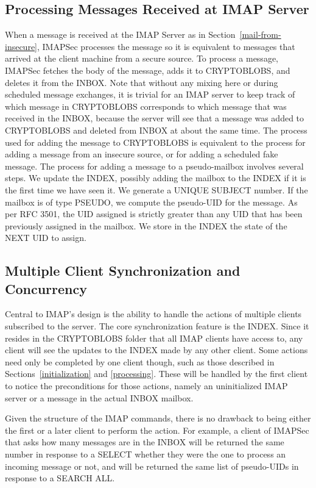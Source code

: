 \documentclass[pageno]{jpaper}
\newcommand{\project}{IMAPSec }
\begin{document}
\subsection{Processing Messages Received at IMAP Server}
When a message is received at the IMAP Server as in Section~\ref{mail-from-insecure}, \project processes the message so it is equivalent to messages that arrived at the client machine from a secure source. To process a message, \project fetches the body of the message, adds it to CRYPTOBLOBS, and deletes it from the INBOX. Note that without any mixing here or during scheduled message exchanges, it is trivial for an IMAP server to keep track of which message in CRYPTOBLOBS corresponds to which message that was received in the INBOX, because the server will see that a message was added to CRYPTOBLOBS and deleted from INBOX at about the same time. The process used for adding the message to CRYPTOBLOBS is equivalent to the process for adding a message from an insecure source, or for adding a scheduled fake message. The process for adding a message to a pseudo-mailbox involves several steps. We update the INDEX, possibly adding the mailbox to the INDEX if it is the first time we have seen it. We generate a UNIQUE SUBJECT number. If the mailbox is of type PSEUDO, we compute the pseudo-UID for the message. As per RFC 3501, the UID assigned is strictly greater than any UID that has been previously assigned in the mailbox. We store in the INDEX the state of the NEXT UID to assign.


\subsection{Multiple Client Synchronization and Concurrency}
Central to IMAP's design is the ability to handle the actions of multiple clients subscribed to the server. The core synchronization feature is the INDEX. Since it resides in the CRYPTOBLOBS folder that all IMAP clients have access to, any client will see the updates to the INDEX made by any other client. Some actions need only be completed by one client though, such as those described in Sections~\ref{initialization} and \ref{processing}. These will be handled by the first client to notice the preconditions for those actions, namely an uninitialized IMAP server or a message in the actual INBOX mailbox.

Given the structure of the IMAP commands, there is no drawback to being either the first or a later client to perform the action. For example, a client of \project that asks how many messages are in the INBOX will be returned the same number in response to a SELECT whether they were the one to process an incoming message or not, and will be returned the same list of pseudo-UIDs in response to a SEARCH ALL.
\end{document}
